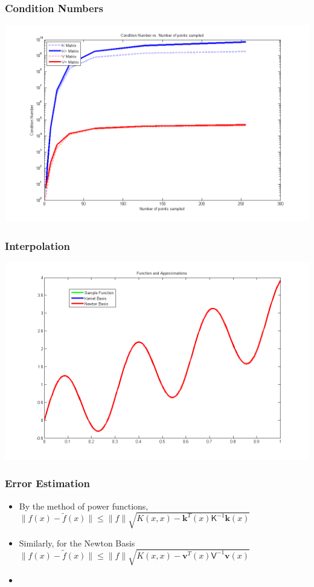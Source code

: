 \documentclass{beamer}
\begin{document}
\begin{frame}
\frametitle{Condition Numbers}
\includegraphics[scale = .45]{condNum}
\end{frame}

\begin{frame}
\frametitle{Interpolation}
\includegraphics[scale = .45]{functionAppx}
\end{frame}

\begin{frame}
\frametitle{Error Estimation}
\begin{itemize}
\item By the method of power functions, $\|f(x)-\tilde{f}(x)\| \leq \|f\|\sqrt{K(x, x)-\mathbf{k}^T(x)\mathsf{K}^{-1}\mathbf{k}(x)}$
\item Similarly, for the Newton Basis  $\|f(x)-\tilde{f}(x)\| \leq \|f\|\sqrt{K(x, x)-\mathbf{v}^T(x)\mathsf{V}^{-1}\mathbf{v}(x)}$
\item \cite{fass07}
\end{itemize}
\end{frame}
\end{document}
